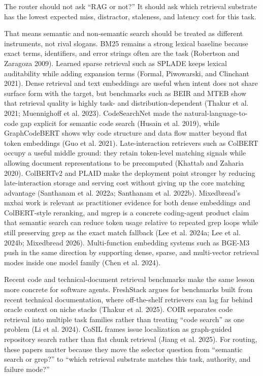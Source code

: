 \documentclass[
  11pt,
  letterpaper,
  numbers=noendperiod,
  parskip=half]{scrartcl}
\begin{document}
The router should not ask ``RAG or not?'' It should ask which retrieval
substrate has the lowest expected miss, distractor, staleness, and
latency cost for this task.

That means semantic and non-semantic search should be treated as
different instruments, not rival slogans. BM25 remains a strong lexical
baseline because exact terms, identifiers, and error strings often are
the task (Robertson and Zaragoza 2009). Learned sparse retrieval such as
SPLADE keeps lexical auditability while adding expansion terms (Formal,
Piwowarski, and Clinchant 2021). Dense retrieval and text embeddings are
useful when intent does not share surface form with the target, but
benchmarks such as BEIR and MTEB show that retrieval quality is highly
task- and distribution-dependent (Thakur et al. 2021; Muennighoff et al.
2023). CodeSearchNet made the natural-language-to-code gap explicit for
semantic code search (Husain et al. 2019), while GraphCodeBERT shows why
code structure and data flow matter beyond flat token embeddings (Guo et
al. 2021). Late-interaction retrievers such as ColBERT occupy a useful
middle ground: they retain token-level matching signals while allowing
document representations to be precomputed (Khattab and Zaharia 2020).
ColBERTv2 and PLAID make the deployment point stronger by reducing
late-interaction storage and serving cost without giving up the core
matching advantage (Santhanam et al. 2022a; Santhanam et al. 2022b).
Mixedbread's mxbai work is relevant as practitioner evidence for both
dense embeddings and ColBERT-style reranking, and mgrep is a concrete
coding-agent product claim that semantic search can reduce token usage
relative to repeated grep loops while still preserving grep as the exact
match fallback (Lee et al. 2024a; Lee et al. 2024b; Mixedbread 2026).
Multi-function embedding systems such as BGE-M3 push in the same
direction by supporting dense, sparse, and multi-vector retrieval modes
inside one model family (Chen et al. 2024).

Recent code and technical-document retrieval benchmarks make the same
lesson more concrete for software agents. FreshStack argues for
benchmarks built from recent technical documentation, where off-the-shelf
retrievers can lag far behind oracle context on niche stacks (Thakur et
al. 2025). COIR separates code retrieval into multiple task families
rather than treating ``code search'' as one problem (Li et al. 2024).
CoSIL frames issue localization as graph-guided repository search rather
than flat chunk retrieval (Jiang et al. 2025). For routing, these papers
matter because they move the selector question from ``semantic search or
grep?'' to ``which retrieval substrate matches this task, authority, and
failure mode?''
\end{document}
